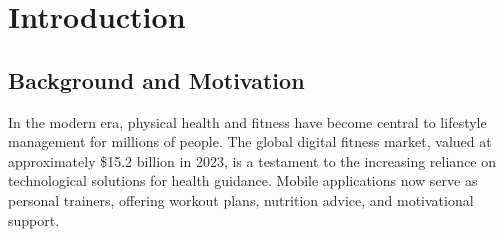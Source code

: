 \documentclass[12pt,a4paper]{report}
\begin{document}

\begin{abstract}
The rapid growth of the digital fitness industry has led to the development of numerous AI-powered coaching systems. However, most contemporary solutions suffer from a lack of personalization, providing generic advice that ignores the individual's training history, experience level, and physiological context. This design project, titled "Design Project NLP CCP," introduces \textbf{FitZone}, a context-aware fitness guidance system that leverages Retrieval-Augmented Generation (RAG) to provide grounded and personalized advice. 

The system architecture integrates a multi-stage NLP preprocessing pipeline with a TF-IDF-based retrieval module over a rich knowledge base of 2,918 exercise records. By dynamically fusing retrieved technical exercise data with real-time user history from Firebase Firestore, the system constructs personalized prompts for the LLaMA 3.1 70B large language model. Our evaluation demonstrates a 59.4\% improvement in BLEU scores and a 42.8\% increase in ROUGE-1 F1 scores compared to non-persoanlized baselines. This report details the full engineering lifecycle of the project, from theoretical design to production deployment.
\end{abstract}

\newpage
\tableofcontents
\newpage
\listoffigures
\listoftables
\newpage

\chapter{Introduction}

\section{Background and Motivation}
In the modern era, physical health and fitness have become central to lifestyle management for millions of people. The global digital fitness market, valued at approximately \$15.2 billion in 2023, is a testament to the increasing reliance on technological solutions for health guidance. Mobile applications now serve as personal trainers, offering workout plans, nutrition advice, and motivational support.
\end{document}
